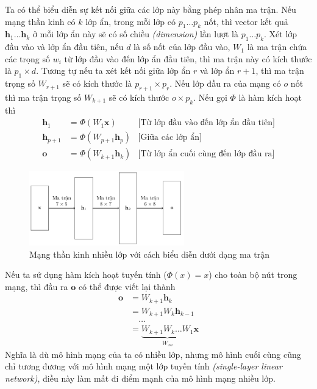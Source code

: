 Ta có thể biểu diễn sự kết nối giữa các lớp này bằng phép nhân ma trận. Nếu mạng thần kinh có $k$ lớp ẩn, trong mỗi lớp có $p_1\dots p_k$ nốt, thì vector kết quả $\mathbf h_1\dots\mathbf h_k$ ở mỗi lớp ẩn này sẽ có số chiều \textit{(dimension)} lần lượt là $p_1\dots p_k$. Xét lớp đầu vào và lớp ẩn đầu tiên, nếu $d$ là số nốt của lớp đầu vào, $W_1$ là ma trận chứa các trọng số $w_i$ từ lớp đầu vào đến lớp ẩn đầu tiên, thì ma trận này có kích thước là $p_1\times d$. Tương tự nếu ta xét kết nối giữa lớp ẩn $r$ và lớp ẩn $r+1$, thì ma trận trọng số $W_{r+1}$ sẽ có kích thước là $p_{r+1}\times p_r$. Nếu lớp đầu ra của mạng có $o$ nốt thì ma trận trọng số $W_{k+1}$ sẽ có kích thước $o\times p_k$. Nếu gọi $\Phi$ là hàm kích hoạt thì
\begin{align}
    \label{equation:matrix-form}
    \mathbf h_1     & =\Phi(W_1\mathbf x)       & \text{[Từ lớp đầu vào đến lớp ẩn đầu tiên]} \\
    \mathbf h_{p+1} & =\Phi(W_{p+1}\mathbf h_p) & \text{[Giữa các lớp ẩn]}                    \\
    \mathbf o       & =\Phi(W_{k+1}\mathbf h_k) & \text{[Từ lớp ẩn cuối cùng đến lớp đầu ra]}
\end{align}
\begin{figure}[htbp]
    \centering
    \includegraphics[width=0.6\textwidth]{tikz_image/multi_layer_matrix.pdf}
    \caption{Mạng thần kinh nhiều lớp với cách biểu diễn dưới dạng ma trận}
    \label{figure:multi-layer-matrix}
\end{figure}

Nếu ta sử dụng hàm kích hoạt tuyến tính ($\Phi(x)=x$) cho toàn bộ nút trong mạng, thì đầu ra $\mathbf o$ có thể được viết lại thành
\begin{align}
    \mathbf o & =W_{k+1}\mathbf h_k                                 \nonumber \\
              & =W_{k+1}W_k\mathbf h_{k-1}                          \nonumber \\
              & \quad\dots                                          \nonumber \\
              & =\underbrace{W_{k+1}W_k\dots W_1}_{W_{xo}}\mathbf x
\end{align}
Nghĩa là dù mô hình mạng của ta có nhiều lớp, nhưng mô hình cuối cùng cũng chỉ tương đương với mô hình mạng một lớp tuyến tính \textit{(single-layer linear network)}, điều này làm mất đi điểm mạnh của mô hình mạng nhiều lớp.

